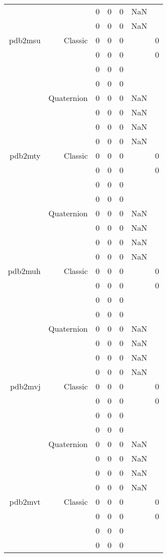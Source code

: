 \begin{xltabular}{\textwidth}{r|rcccSc}
& & 0 & 0 & 0 & NaN & \\
& & 0 & 0 & 0 & NaN & \\ \addlinespace
pdb2msu & Classic & 0 & 0 & 0 & & 0 \\
& & 0 & 0 & 0 & & 0 \\
& & 0 & 0 & 0 & & \\
& & 0 & 0 & 0 & & \\
& Quaternion & 0 & 0 & 0 & NaN & \\
& & 0 & 0 & 0 & NaN & \\
& & 0 & 0 & 0 & NaN & \\
& & 0 & 0 & 0 & NaN & \\ \addlinespace
pdb2mty & Classic & 0 & 0 & 0 & & 0 \\
& & 0 & 0 & 0 & & 0 \\
& & 0 & 0 & 0 & & \\
& & 0 & 0 & 0 & & \\
& Quaternion & 0 & 0 & 0 & NaN & \\
& & 0 & 0 & 0 & NaN & \\
& & 0 & 0 & 0 & NaN & \\
& & 0 & 0 & 0 & NaN & \\ \addlinespace
pdb2muh & Classic & 0 & 0 & 0 & & 0 \\
& & 0 & 0 & 0 & & 0 \\
& & 0 & 0 & 0 & & \\
& & 0 & 0 & 0 & & \\
& Quaternion & 0 & 0 & 0 & NaN & \\
& & 0 & 0 & 0 & NaN & \\
& & 0 & 0 & 0 & NaN & \\
& & 0 & 0 & 0 & NaN & \\ \addlinespace
pdb2mvj & Classic & 0 & 0 & 0 & & 0 \\
& & 0 & 0 & 0 & & 0 \\
& & 0 & 0 & 0 & & \\
& & 0 & 0 & 0 & & \\
& Quaternion & 0 & 0 & 0 & NaN & \\
& & 0 & 0 & 0 & NaN & \\
& & 0 & 0 & 0 & NaN & \\
& & 0 & 0 & 0 & NaN & \\ \addlinespace
pdb2mvt & Classic & 0 & 0 & 0 & & 0 \\
& & 0 & 0 & 0 & & 0 \\
& & 0 & 0 & 0 & & \\
& & 0 & 0 & 0 & & \\

\end{xltabular}
